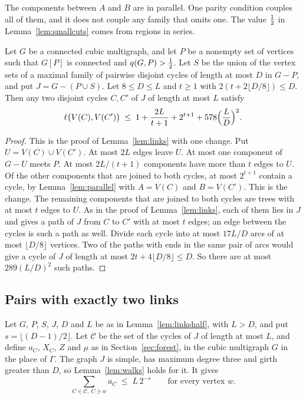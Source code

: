 The components between $A$ and $B$ are in parallel. One parity condition couples all of them, and
it does not couple any family that omits one. The value $\tfrac12$ in Lemma~\ref{lem:smallcuts} comes
from regions in series.

\begin{lemma}\label{lem:linkshalf}
Let $G$ be a connected cubic multigraph, and let $P$ be a nonempty set of vertices such that $G[P]$
is connected and $q(G,P)>\tfrac12$. Let $S$ be the union of the vertex sets of a maximal family of
pairwise disjoint cycles of length at most $D$ in $G-P$, and put $J=G-(P\cup S)$. Let
$8\le D\le L$ and $t\ge1$ with $2(t+2\lfloor D/8\rfloor)\le D$. Then any two disjoint cycles $C,C'$
of $J$ of length at most $L$ satisfy
\[
  \ell\bigl(V(C),V(C')\bigr)\;\le\;1+\frac{2L}{t+1}+2^{t+1}+578\Bigl(\frac LD\Bigr)^{2}.
\]
\end{lemma}

\begin{proof}
This is the proof of Lemma~\ref{lem:links} with one change. Put $U=V(C)\cup V(C')$. At most $2L$
edges leave $U$. At most one component of $G-U$ meets $P$. At most $2L/(t+1)$ components have more
than $t$ edges to $U$. Of the other components that are joined to both cycles, at most $2^{t+1}$
contain a cycle, by Lemma~\ref{lem:parallel} with $A=V(C)$ and $B=V(C')$. This is the change. The
remaining components that are joined to both cycles are trees with at most $t$ edges to $U$. As in
the proof of Lemma~\ref{lem:links}, each of them lies in $J$ and gives a path of $J$ from $C$ to
$C'$ with at most $t$ edges; an edge between the cycles is such a path as well. Divide each cycle
into at most $17L/D$ arcs of at most $\lfloor D/8\rfloor$ vertices. Two of the paths with ends in the
same pair of arcs would give a cycle of $J$ of length at most $2t+4\lfloor D/8\rfloor\le D$. So
there are at most $289(L/D)^{2}$ such paths.
\end{proof}

\subsection{Pairs with exactly two links}

Let $G$, $P$, $S$, $J$, $D$ and $L$ be as in Lemma~\ref{lem:linkshalf}, with $L>D$, and put
$s=\lfloor(D-1)/2\rfloor$. Let $\mathcal C$ be the set of the cycles of $J$ of length at most $L$,
and define $a_C$, $X_C$, $Z$ and $\mu$ as in Section~\ref{sec:forest}, in the cubic multigraph $G$
in the place of $\Gamma$. The graph $J$ is simple, has maximum degree three and girth greater than
$D$, so Lemma~\ref{lem:walks} holds for it. It gives
\begin{equation}\label{eq:load}
  \sum_{C\in\mathcal C,\ C\ni w}a_C\;\le\;L\,2^{-s}\qquad\text{for every vertex }w.
\end{equation}

